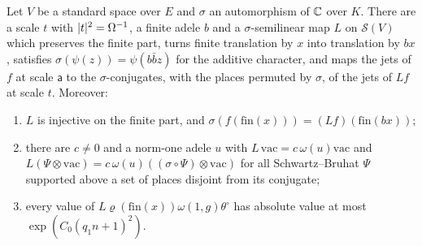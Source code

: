 \begin{theorem}\label{thm:jet-conjugation}
Let $V$ be a standard space over $E$ and $\sigma$ an automorphism of $\mathbb{C}$ over $K$. There are a scale $t$ with
$\lvert t\rvert^2=\Omega^{-1}$, a finite adele $b$ and a $\sigma$-semilinear map $L$ on $\mathcal S(V)$ which preserves the finite
part, turns finite translation by $x$ into translation by $bx$, satisfies $\sigma(\psi(z))=\psi(b\bar bz)$ for the
additive character, and maps the jets of $f$ at scale $\mathsf a$ to the $\sigma$-conjugates, with the places permuted by
$\sigma$, of the jets of $Lf$ at scale $t$. Moreover:
\begin{enumerate}[label=\textup{(\alph*)}]
\item $L$ is injective on the finite part, and $\sigma(f(\mathrm{fin}(x)))=(Lf)(\mathrm{fin}(bx))$;
\item there are $c\ne0$ and a norm-one adele $u$ with $L\,\mathrm{vac}=c\,\omega(u)\mathrm{vac}$ and
$L(\Psi\otimes\mathrm{vac})=c\,\omega(u)((\sigma\circ\Psi)\otimes\mathrm{vac})$ for all Schwartz--Bruhat $\Psi$ supported above a set
of places disjoint from its conjugate;
\item every value of $L\varrho(\mathrm{fin}(x))\omega(1,g)\theta^\circ$ has absolute value at most $\exp(C_0(q_1n+1)^2)$.
\end{enumerate}
\end{theorem}

